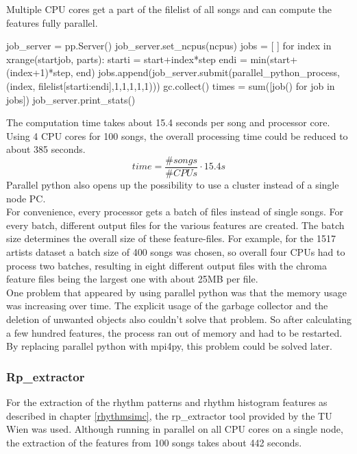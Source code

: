 Multiple CPU cores get a part of the filelist of all songs and can compute the features fully parallel.
\begin{pythonCode}[frame=single,label={lst:pp},caption={parallel python},captionpos=b]
job_server = pp.Server()
job_server.set_ncpus(ncpus)
jobs = [ ]
for index in xrange(startjob, parts):
	starti = start+index*step
	endi = min(start+(index+1)*step, end)
	jobs.append(job_server.submit(parallel_python_process, (index, 
		filelist[starti:endi],1,1,1,1,1)))
	gc.collect()
times = sum([job() for job in jobs])
job_server.print_stats()
\end{pythonCode}
The computation time takes about 15.4 seconds per song and processor core. Using 4 CPU cores for 100 songs, the overall processing time could be reduced to about 385 seconds. 
\begin{equation} \label{eq:parallelp}
time = \frac{\#songs}{\#CPUs} \cdot 15.4s
\end{equation}
Parallel python also opens up the possibility to use a cluster instead of a single node PC.\\
For convenience, every processor gets a batch of files instead of single songs. For every batch, different output files for the various features are created. The batch size determines the overall size of these feature-files. For example, for the 1517 artists dataset a batch size of 400 songs was chosen, so overall four CPUs had to process two batches, resulting in eight different output files with the chroma feature files being the largest one with about 25MB per file.\\
One problem that appeared by using parallel python was that the memory usage was increasing over time. The explicit usage of the garbage collector and the deletion of unwanted objects also couldn't solve that problem. So after calculating a few hundred features, the process ran out of memory and had to be restarted. By replacing parallel python with mpi4py, this problem could be solved later. 

\subsubsection{Rp\_extractor}

For the extraction of the rhythm patterns and rhythm histogram features as described in chapter \ref{rhythmsimc}, the rp\_extractor tool provided by the TU Wien was used. Although running in parallel on all CPU cores on a single node, the extraction of the features from 100 songs takes about 442 seconds.

